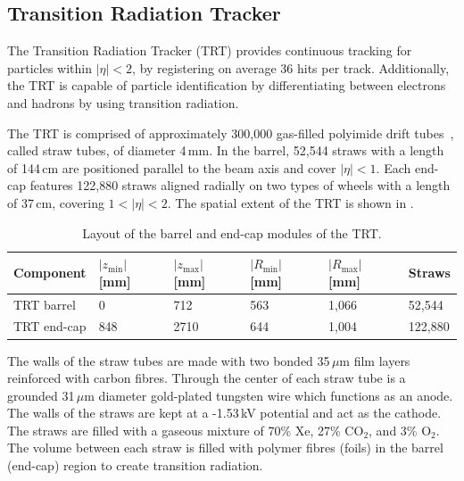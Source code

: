 %
\subsection{Transition Radiation Tracker}
The Transition Radiation Tracker (TRT) provides continuous tracking for particles within $|\eta|<2$, by registering on average 36 hits per track. Additionally, the TRT is capable of particle identification by differentiating between electrons and hadrons by using transition radiation.

The TRT is comprised of approximately 300,000 gas-filled polyimide drift tubes~\cite{TRT_sensors}, called straw tubes, of diameter 4\,mm. In the barrel, 52,544 straws with a length of 144\,cm are positioned parallel to the beam axis  and cover $|\eta| < 1$. Each end-cap features 122,880 straws aligned radially on two types of wheels with a length of 37\,cm, covering $1<|\eta|<2$. The spatial extent of the TRT is shown in \Tab{\ref{tab:trt_layout}}.

\begin{table}[bh]
\begin{center}
\caption[Transition Radiation Tracker spatial layout]{Layout of the barrel and end-cap modules of the TRT.}
\label{tab:trt_layout}
\begin{tabular}{llllll}
\hline
\textbf{Component} & $|z_{\text{min}}|$ [mm]& $|z_{\text{max}}|$ [mm]& $|R_{\text{min}}|$ [mm]& $|R_{\text{max}}|$ [mm] & \textbf{Straws} \\ \hline\hline
TRT barrel & 0 & 712 & 563 & 1,066 & 52,544\\
TRT end-cap & 848 & 2710 & 644 & 1,004 & 122,880 \\ 
\hline
\end{tabular}
\end{center}
\end{table}



The walls of the straw tubes are made with two bonded 35\,$\mu$m film layers
reinforced with carbon fibres. Through the center of each straw tube is a grounded 31\,$\mu$m diameter gold-plated
tungsten wire which functions as an anode. The walls of the straws are kept at a -1.53\,kV potential and act as the cathode. The straws are filled with a gaseous mixture of 70\% Xe, 27\% CO$_2$, and 3\% O$_2$.
The volume between each straw is filled with polymer fibres (foils) in the barrel (end-cap) region to create transition radiation.

